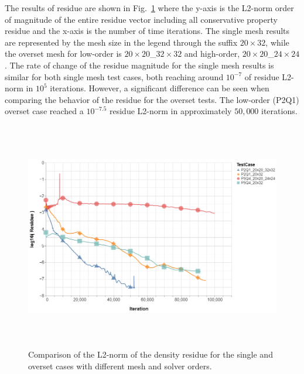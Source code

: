 The results of residue are shown in Fig.\ \ref{fig:cylinder_residue} where the y-axis is the L2-norm order of magnitude of the entire residue vector including all conservative property residue and the x-axis is the number of time iterations. The single mesh results are represented by the mesh size in the legend through the suffix $20 \times 32$, while the overset mesh for low-order is $20 \times 20$\_{$32 \times 32$} and high-order, $20 \times 20$\_{$24 \times 24$}. The rate of change of the residue magnitude for the single mesh results is similar for both single mesh test cases, both reaching around $10^{-7}$ of residue L2-norm in $10^{5}$ iterations. However, a significant difference can be seen when comparing the behavior of the residue for the overset tests. The low-order (P2Q1) overset case reached a $10^{-7.5}$ residue L2-norm in approximately $50,000$ iterations. 

\begin{figure}[H]
	\centering
   	\includegraphics[height=10.0cm]{figs/results/cylinder/residue.png}
    \caption{Comparison of the L2-norm of the density residue for the single and overset cases with different mesh and solver orders.}
    \label{fig:cylinder_residue}
\end{figure}

